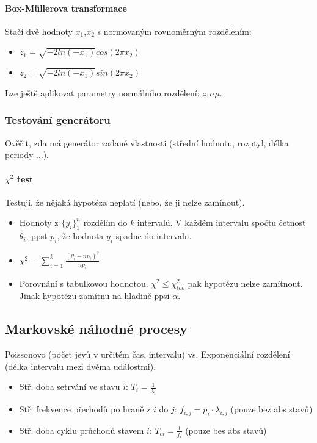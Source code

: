 \documentclass[11pt,a4paper]{scrartcl}
\begin{document}
	\paragraph{Box-Müllerova transformace}
	Stačí dvě hodnoty $x_1$,$x_2$ s normovaným rovnoměrným rozdělením: 
	\begin{itemize}
		\item $z_1 = \sqrt{-2ln(-x_1)}cos(2\pi x_2)$
		\item $z_2 = \sqrt{-2ln(-x_1)}sin(2\pi x_2)$
	\end{itemize}
    
    Lze ještě aplikovat parametry normálního rozdělení: $z_1 \sigma \mu $.
	
	\subsubsection{Testování generátoru} 
	Ověřit, zda má generátor zadané vlastnosti (střední hodnotu, rozptyl, délka periody ...).
	
	\paragraph{$\chi^2$ test} Testuji, že nějaká hypotéza neplatí (nebo, že ji nelze zamínout). 
	
	\begin{itemize}
\item 	Hodnoty z $\{y_i\}_1^n$ rozdělím do $k$ intervalů. V každém intervalu spočtu četnost $\theta_i$, ppst $p_i$, že hodnota $y_i$ spadne do intervalu. 

\item  $\chi^2=\sum_{i=1}^{k} \frac{(\theta_i - np_i)^2}{np_i}$
\item Porovnání s tabulkovou hodnotou. $\chi^2 \le \chi_{tab}^2$ pak hypotézu nelze zamítnout. Jinak hypotézu zamítnu na hladině ppsi $\alpha$.
	\end{itemize}
	
	\subsection{Markovské náhodné procesy}
	Poissonovo (počet jevů v určitém čas. intervalu) vs. Exponenciální rozdělení (délka intervalu mezi dvěma událostmi).
	
	\begin{itemize}
		\item Stř. doba setrvání ve stavu $i$: $T_i=\frac{1}{\lambda_i}$
		\item Stř. frekvence přechodů po hraně z $i$ do $j$: $f_{i,j}=p_i\cdot\lambda_{i,j}$ (pouze bez abs stavů)
		\item Stř. doba cyklu průchodů stavem $i$: $T_{ci} = \frac{1}{f_i}$ (pouze bes abs stavů)
	\end{itemize}
	
\end{document}
